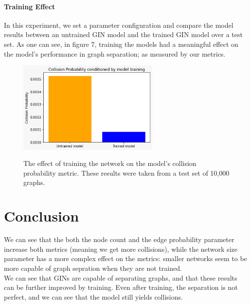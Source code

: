 \documentclass{article}
\begin{document}
\subsection*{Training Effect}
In this experiment, we set a parameter configuration and compare the model results between an untrained GIN model
and the trained GIN model over a test set.
As one can see, in figure 7, training the models had a
meaningful effect on the model's performance in graph separation; as measured by our metrics.
\begin{figure}
    \begin{center}
        \includegraphics[width=7cm]{../figures/Training_Performance_Bars.png}\\
        \caption{The effect of training the network on the model's collision probability metric.
        These results were taken from a test set of 10,000 graphs.}
    \end{center}
\end{figure}    


\part*{Conclusion}
We can see that the both the node count and the edge probability parameter increase both metrics (meaning we get more collisions),
while the network size parameter has a more complex effect on the metrics: smaller networks seem to be more capable of graph sepration
when they are not trained.\\
We can see that GINs are capable of separating graphs, and that these results can be further improved by training.
Even after training, the separation is not perfect, and we can see that the model still yields collisions.
\end{document}
